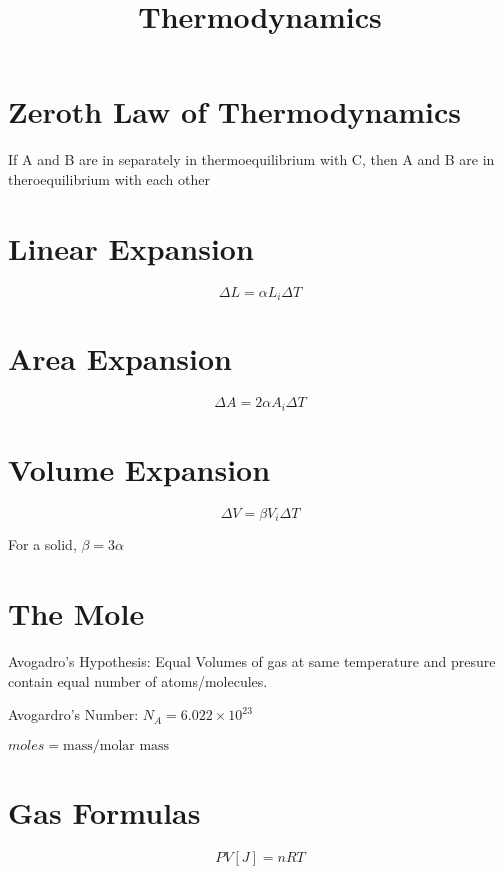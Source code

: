 \documentclass[12pt]{article}
\title{\textbf{Thermodynamics}}
\date{}
\begin{document}
\maketitle

\begin{spacing}{1.5}

\section{Zeroth Law of Thermodynamics}

If A and B are in separately in thermoequilibrium with C, then A and B are in theroequilibrium with each other

\section{Linear Expansion}

$$\Delta L = \alpha L_i \Delta T$$

\section{Area Expansion}

$$\Delta A = 2\alpha A_i \Delta T$$

\section{Volume Expansion}

$$\Delta V = \beta V_i \Delta T$$

For a solid, $\beta = 3\alpha$

\section{The Mole}

Avogadro's Hypothesis: Equal Volumes of gas at same temperature and presure contain equal number of atoms/molecules. 

Avogardro's Number: $N_A = 6.022 \times 10^{23}$

$moles = \text{mass}/\text{molar mass}$

\section{\color{red} Gas Formulas}

$$PV [J] = nRT$$



\end{spacing}
\end{document}
